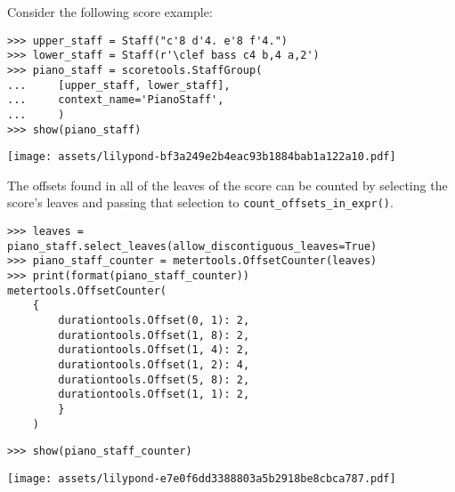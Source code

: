 Consider the following score example:

\begin{comment}
<abjad>
upper_staff = Staff("c'8 d'4. e'8 f'4.")
lower_staff = Staff(r'\clef bass c4 b,4 a,2')
piano_staff = scoretools.StaffGroup(
    [upper_staff, lower_staff],
    context_name='PianoStaff',
    )
show(piano_staff)
</abjad>
\end{comment}

\begin{singlespacing}
\vspace{-0.5\baselineskip}
\begin{lstlisting}
>>> upper_staff = Staff("c'8 d'4. e'8 f'4.")
>>> lower_staff = Staff(r'\clef bass c4 b,4 a,2')
>>> piano_staff = scoretools.StaffGroup(
...     [upper_staff, lower_staff],
...     context_name='PianoStaff',
...     )
>>> show(piano_staff)
\end{lstlisting}
\noindent\texttt{[image: assets/lilypond-bf3a249e2b4eac93b1884bab1a122a10.pdf]}
\end{singlespacing}

\noindent The offsets found in all of the leaves of the score can be counted by
selecting the score's leaves and passing that selection to
\texttt{count\_offsets\_in\_expr()}.

\begin{comment}
<abjad>
leaves = piano_staff.select_leaves(allow_discontiguous_leaves=True)
piano_staff_counter = metertools.OffsetCounter(leaves)
print(format(piano_staff_counter))
show(piano_staff_counter)
</abjad>
\end{comment}

\begin{singlespacing}
\vspace{-0.5\baselineskip}
\begin{lstlisting}
>>> leaves = piano_staff.select_leaves(allow_discontiguous_leaves=True)
>>> piano_staff_counter = metertools.OffsetCounter(leaves)
>>> print(format(piano_staff_counter))
metertools.OffsetCounter(
    {
        durationtools.Offset(0, 1): 2,
        durationtools.Offset(1, 8): 2,
        durationtools.Offset(1, 4): 2,
        durationtools.Offset(1, 2): 4,
        durationtools.Offset(5, 8): 2,
        durationtools.Offset(1, 1): 2,
        }
    )
\end{lstlisting}
\begin{lstlisting}
>>> show(piano_staff_counter)
\end{lstlisting}
\noindent\texttt{[image: assets/lilypond-e7e0f6dd3388803a5b2918be8cbca787.pdf]}
\end{singlespacing}


